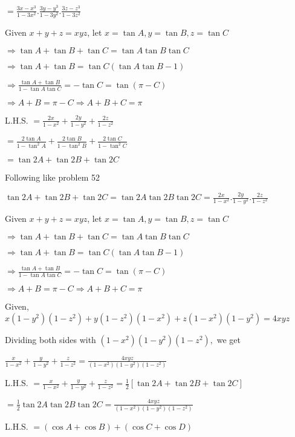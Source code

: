   $= \frac{3x - x^3}{1 - 3x^2}.\frac{3y - y^3}{1 - 3y^2}.\frac{3z - z^3}{1 - 3z^2}$

\item Given $x + y + z = xyz$, let $x = \tan A, y = \tan B, z = \tan C$

  $\Rightarrow \tan A + \tan B + \tan C = \tan A\tan B\tan C$

  $\Rightarrow \tan A + \tan B = \tan C(\tan A\tan B - 1)$

  $\Rightarrow \frac{\tan A + \tan B}{1 - \tan A\tan C} = -\tan C = \tan(\pi - C)$

  $\Rightarrow A + B = \pi - C \Rightarrow A + B + C = \pi$

  L.H.S. $= \frac{2x}{1 - x^2} + \frac{2y}{1 - y^2} + \frac{2z}{1 - z^2}$

  $= \frac{2\tan A}{1 - \tan^2A} + \frac{2\tan B}{1 - \tan^2B} + \frac{2\tan C}{1 - \tan^2C}$

  $= \tan 2A + \tan 2B + \tan 2C$

  Following like problem 52

  $\tan 2A + \tan 2B + \tan 2C = \tan2A\tan2B\tan2C = \frac{2x}{1 - x^2}.\frac{2y}{1 - y^2}.\frac{2z}{1 - z^2}$

\item Given $x + y + z = xyz$, let $x = \tan A, y = \tan B, z = \tan C$

  $\Rightarrow \tan A + \tan B + \tan C = \tan A\tan B\tan C$

  $\Rightarrow \tan A + \tan B = \tan C(\tan A\tan B - 1)$

  $\Rightarrow \frac{\tan A + \tan B}{1 - \tan A\tan C} = -\tan C = \tan(\pi - C)$

  $\Rightarrow A + B = \pi - C \Rightarrow A + B + C = \pi$

  Given, $x(1 - y^2)(1 - z^2) + y(1 - z^2)(1 - x^2) + z(1 - x^2)(1 - y^2) = 4xyz$

  Dividing both sides with $(1 - x^2)(1 - y^2)(1 - z^2),$ we get

  $\frac{x}{1 - x^2} + \frac{y}{1 - y^2} + \frac{z}{1 - z^2} = \frac{4xyz}{(1 - x^2)(1 - y^2)(1 - z^2)}$

  L.H.S. $= \frac{x}{1 - x^2} + \frac{y}{1 - y^2} + \frac{z}{1 - z^2} = \frac{1}{2}[\tan 2A + \tan 2B + \tan 2C]$

  $= \frac{1}{2}\tan2A\tan2B\tan2C = \frac{4xyz}{(1 - x^2)(1 - y^2)(1 - z^2)}$

\item L.H.S. $= (\cos A + \cos B) + (\cos C + \cos D)$

